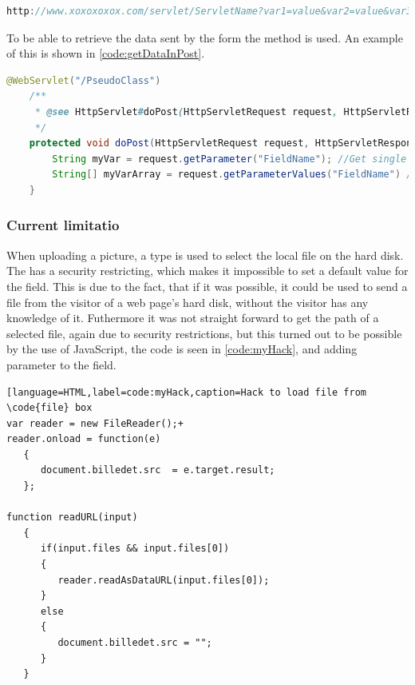 \begin{lstlisting}[language=Java,label=code:URLLINK,caption=URL with visible parameters]
http://www.xoxoxoxox.com/servlet/ServletName?var1=value&var2=value&var3=value
\end{lstlisting}

To be able to retrieve the data sent by the form the  method is used. An example of this is shown in \autoref{code:getDataInPost}.

\begin{lstlisting}[language=Java,label=code:getDataInPost,caption=How to read parameters]
	@WebServlet("/PseudoClass")
	/**
	 * @see HttpServlet#doPost(HttpServletRequest request, HttpServletResponse response)
	 */
	protected void doPost(HttpServletRequest request, HttpServletResponse response) throws ServletException, IOException {
		String myVar = request.getParameter("FieldName"); //Get single Value
		String[] myVarArray = request.getParameterValues("FieldName") //Get string array
	}
\end{lstlisting}

\subsubsection{Current limitatio}
When uploading a picture, a  type is used to select the local file on the hard disk. The  has a security restricting, which makes it impossible to set a default value for the field. This is due to the fact, that if it was possible, it could be used to send a file from the visitor of a web page's hard disk, without the visitor has any knowledge of it\cite{noFile}. Futhermore it was not straight forward to get the path of a selected file, again due to security restrictions, but this turned out to be possible by the use of JavaScript, the code is seen in \autoref{code:myHack}, and adding parameter  to the  field.

\begin{lstlisting}[language=HTML,label=code:myHack,caption=Hack to load file from \code{file} box
var reader = new FileReader();+
reader.onload = function(e) 
   {
      document.billedet.src  = e.target.result;
   };

function readURL(input)
   {
      if(input.files && input.files[0])
      {
         reader.readAsDataURL(input.files[0]);
      }
      else 
      {
         document.billedet.src = "";
      }
   }
\end{lstlisting}

